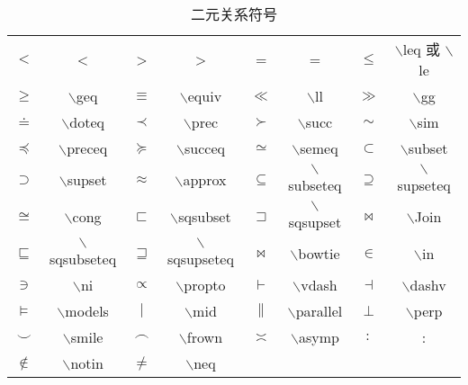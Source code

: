\documentclass[UTF8]{ctexart}
\begin{document}
\begin{table}[H]
	\begin{center}
		\caption{二元关系符号}
		\begin{tabular}{cccccccc}
			
			$<$ & < & > & >  &  =   & =  & $\leq$  &  $\backslash$leq 或 $\backslash$le  \\
			
			$\geq$  &  $\backslash$geq  &  $\equiv$  & $\backslash$equiv  &  $\ll$  & $\backslash$ll  &  $\gg$  &  $\backslash$gg \\
			
			$\doteq$ & $\backslash$doteq &  $\prec$  & $\backslash$prec   &  $\succ$  & $\backslash$succ &  $\sim$ & $\backslash$sim \\
			
			
			$\preceq$  &  $\backslash$preceq  &  $\succeq$  & $\backslash$succeq  &  $\simeq$  & $\backslash$semeq  &  $\subset$  &  $\backslash$subset \\
			
			$\supset$ & $\backslash$supset &  $\approx$  & $\backslash$approx   &  $\subseteq$  & $\backslash$subseteq &  $\supseteq$ & $\backslash$supseteq \\
			
			$\cong$ & $\backslash$cong &  $\sqsubset$  & $\backslash$sqsubset   &  $\sqsupset$  & $\backslash$sqsupset &  $\Join$ & $\backslash$Join \\	
			
			$\sqsubseteq$ & $\backslash$sqsubseteq &  $\sqsupseteq$  & $\backslash$sqsupseteq   &  $\bowtie$  & $\backslash$bowtie &  $\in$ & $\backslash$in \\
				
				
			$\ni$ & $\backslash$ni &  $\propto$  & $\backslash$propto   &  $\vdash$  & $\backslash$vdash &  $\dashv$ & $\backslash$dashv \\	

			$\models$ & $\backslash$models &  $\mid$  & $\backslash$mid   &  $\parallel$  & $\backslash$parallel &  $\perp$ & $\backslash$perp \\


			$\smile$ & $\backslash$smile &  $\frown$  & $\backslash$frown   &  $\asymp$  & $\backslash$asymp &  $:$ & : \\	

			$\notin$ & $\backslash$notin &  $\neq$  & $\backslash$neq \\

				
					
		\end{tabular}
	\end{center}
\end{table}
\end{document}
